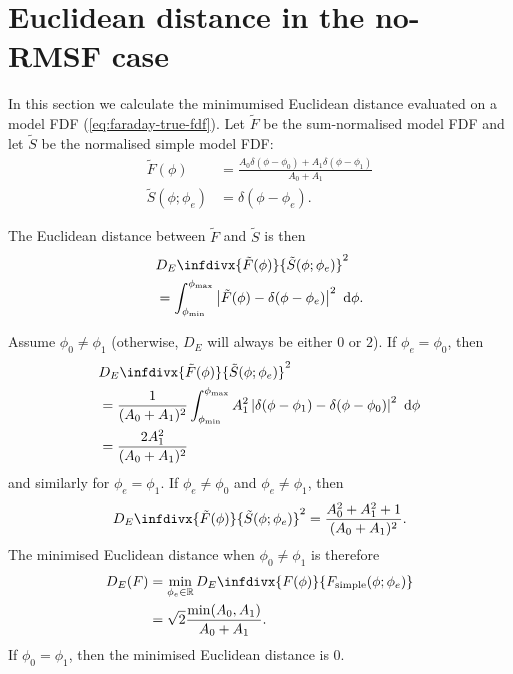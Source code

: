 \section{Euclidean distance in the no-RMSF case}
\label{sec:faraday-euclidean-calculation}

  In this section we calculate the minimumised Euclidean distance evaluated on a model FDF (\autoref{eq:faraday-true-fdf}). Let $\tilde F$ be the sum-normalised model FDF and let $\tilde S$ be the normalised simple model FDF:
  \begin{align}
    \tilde F(\phi) &= \frac{A_0 \delta(\phi - \phi_0) + A_1 \delta(\phi - \phi_1)}{A_0 + A_1}\\
    \tilde S(\phi; \phi_e) &= \delta(\phi - \phi_e).
  \end{align}

  The Euclidean distance between $\tilde F$ and $\tilde S$ is then
  \begin{align}
    &D_E\infdivx{\tilde F(\phi)}{\tilde S(\phi; \phi_e)}^2\\
    &= \int_{\phi_{\min}}^{\phi_{\max}} \left|\tilde F(\phi) - \delta(\phi - \phi_e) \right|^2\ \mathrm{d}\phi.
  \end{align}

  Assume $\phi_0 \neq \phi_1$ (otherwise, $D_E$ will always be either $0$ or $2$). If $\phi_e = \phi_0$, then
  \begin{align}
    &D_E\infdivx{\tilde F(\phi)}{\tilde S(\phi; \phi_e)}^2\\
      &= \frac{1}{(A_0 + A_1)^2} \int_{\phi_{\min}}^{\phi_{\max}} A_1^2 \left|\delta(\phi - \phi_1) - \delta(\phi - \phi_0) \right|^2\ \mathrm{d}\phi\\
      &= \frac{2 A_1^2}{(A_0 + A_1)^2}
  \end{align}
  and similarly for $\phi_e = \phi_1$. If $\phi_e \neq \phi_0$ and $\phi_e \neq \phi_1$, then
  \begin{equation}
    D_E\infdivx{\tilde F(\phi)}{\tilde S(\phi; \phi_e)}^2 = \frac{A_0^2 + A_1^2 + 1}{(A_0 + A_1)^2}.
  \end{equation}
  The minimised Euclidean distance when $\phi_0 \neq \phi_1$ is therefore
  \begin{align}
      D_E(F) &= \min_{\phi_e \in \mathbb{R}} D_E\infdivx{F(\phi)}{F_{\mathrm{simple}}(\phi; \phi_e)}\\
          &= \sqrt{2} \frac{\min(A_0, A_1)}{A_0 + A_1}.
  \end{align}
  If $\phi_0 = \phi_1$, then the minimised Euclidean distance is 0.

